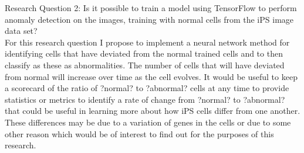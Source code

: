 {Research Question 2: Is it possible to train a model using TensorFlow to perform anomaly detection on the images, training with normal cells from the iPS image data set? \\ 
For this research question I propose to implement a neural network method for identifying cells that have deviated from the normal trained cells and to then classify as these as abnormalities. The number of cells that will have deviated from normal will increase over time as the cell evolves. It would be useful to keep a scorecard of the ratio of ?normal? to ?abnormal? cells at any time to provide statistics or metrics to identify a rate of change from ?normal? to ?abnormal? that could be useful in learning more about how iPS cells differ from one another. These differences may be due to a variation of genes in the cells or due to some other reason which would be of interest to find out for the purposes of this research. \\ \\
}
